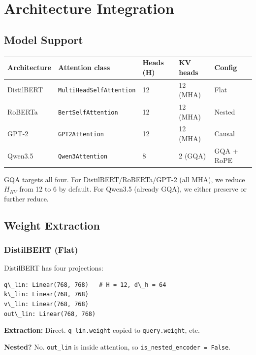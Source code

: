 
\section{Architecture Integration}

\subsection{Model Support}

\begin{table}[H]
\centering
\small
\begin{tabular}{lllll}
\toprule
\textbf{Architecture} & \textbf{Attention class} & \textbf{Heads (H)} & \textbf{KV heads} & \textbf{Config} \\
\midrule
DistilBERT & \texttt{MultiHeadSelfAttention} & 12 & 12 (MHA) & Flat \\
RoBERTa & \texttt{BertSelfAttention} & 12 & 12 (MHA) & Nested \\
GPT-2 & \texttt{GPT2Attention} & 12 & 12 (MHA) & Causal \\
Qwen3.5 & \texttt{Qwen3Attention} & 8 & 2 (GQA) & GQA + RoPE \\
\bottomrule
\end{tabular}
\end{table}

GQA targets all four. For DistilBERT/RoBERTa/GPT-2 (all MHA), we reduce 
$H_{KV}$ from 12 to 6 by default. For Qwen3.5 (already GQA), we either 
preserve or further reduce.

\subsection{Weight Extraction}

\subsubsection{DistilBERT (Flat)}

DistilBERT has four projections:

\begin{lstlisting}
q\_lin: Linear(768, 768)   # H = 12, d\_h = 64
k\_lin: Linear(768, 768)
v\_lin: Linear(768, 768)
out\_lin: Linear(768, 768)
\end{lstlisting}

\textbf{Extraction:} Direct. \texttt{q\_lin.weight} copied to \texttt{query.weight}, etc.

\textbf{Nested?} No. \texttt{out\_lin} is inside attention, so \texttt{is\_nested\_encoder = False}.

